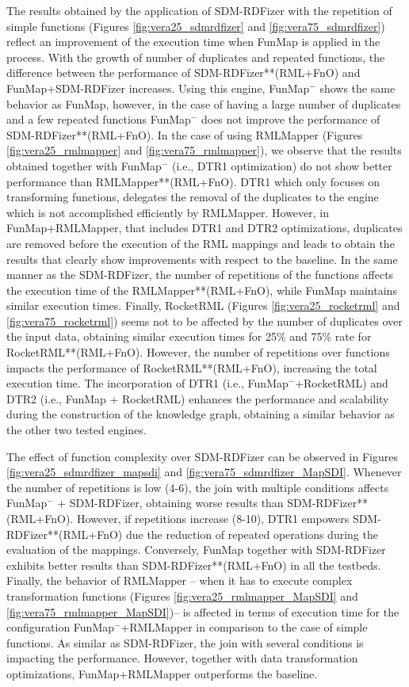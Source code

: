 The results obtained by the application of SDM-RDFizer with the repetition of simple functions (Figures \ref{fig:vera25_sdmrdfizer} and \ref{fig:vera75_sdmrdfizer}) reflect an improvement of the execution time when FunMap is applied in the process. With the growth of number of duplicates and repeated functions, the difference between the performance of SDM-RDFizer**(RML+FnO) and FunMap+SDM-RDFizer increases. Using this engine, FunMap$^-$ shows the same behavior as FunMap, however, in the case of having a large number of duplicates and a few repeated functions FunMap$^-$ does not improve the performance of SDM-RDFizer**(RML+FnO). 
In the case of using RMLMapper (Figures \ref{fig:vera25_rmlmapper} and \ref{fig:vera75_rmlmapper}), we observe that the results obtained together with FunMap$^-$ (i.e., DTR1 optimization) do not show better performance than RMLMapper**(RML+FnO). DTR1 which only focuses on transforming functions, delegates the removal of the duplicates to the engine which is not accomplished efficiently by RMLMapper. However, in FunMap+RMLMapper, that includes DTR1 and DTR2 optimizations, duplicates are removed before the execution of the RML mappings and leads to obtain the results that clearly show improvements with respect to the baseline. In the same manner as the SDM-RDFizer, the number of repetitions of the functions affects the execution time of the RMLMapper**(RML+FnO), while FunMap maintains similar execution times. Finally, RocketRML (Figures \ref{fig:vera25_rocketrml} and \ref{fig:vera75_rocketrml}) seems not to be affected by the number of duplicates over the input data, obtaining similar execution times for 25\% and 75\% rate for RocketRML**(RML+FnO). However, the number of repetitions over functions impacts the performance of RocketRML**(RML+FnO), increasing the total execution time. The incorporation of DTR1 (i.e., FunMap$^-$+RocketRML) and DTR2 (i.e., FunMap + RocketRML) enhances the performance and scalability during the construction of the knowledge graph, obtaining a similar behavior as the other two tested engines. 

The effect of function complexity over SDM-RDFizer can be observed in Figures \ref{fig:vera25_sdmrdfizer_mapsdi} and \ref{fig:vera75_sdmrdfizer_MapSDI}. Whenever the number of repetitions is low (4-6), the join with multiple conditions affects FunMap$^-$ + SDM-RDFizer, obtaining worse results than SDM-RDFizer**(RML+FnO). However, if repetitions increase (8-10), DTR1 empowers SDM-RDFizer**(RML+FnO) due the reduction of repeated operations during the evaluation of the mappings. Conversely, FunMap together with SDM-RDFizer exhibits better results than SDM-RDFizer**(RML+FnO) in all the testbeds. Finally, the behavior of RMLMapper -- when it has to execute complex transformation functions (Figures \ref{fig:vera25_rmlmapper_MapSDI} and \ref{fig:vera75_rmlmapper_MapSDI})-- is affected in terms of execution time for the configuration FunMap$^-$+RMLMapper in comparison to the case of simple functions. As similar as SDM-RDFizer, the join with several conditions is impacting the performance. However, together with data transformation optimizations, FunMap+RMLMapper outperforms the baseline. 

